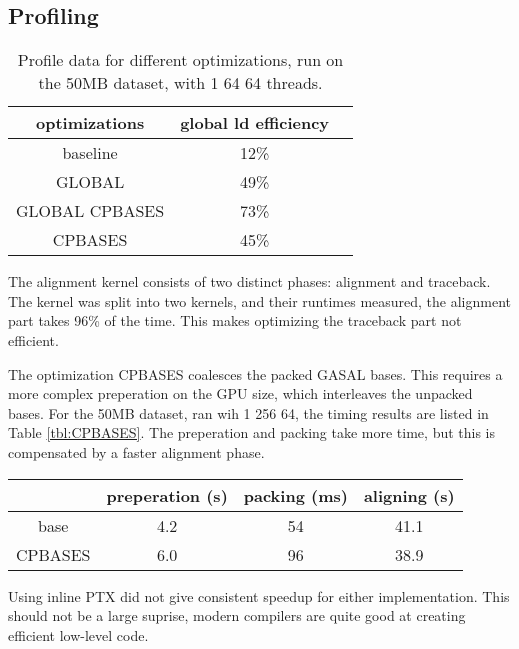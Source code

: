 \documentclass[../main/thesis.tex]{subfiles}
\begin{document}
\subsection{Profiling}

\begin{table}
\centering
\caption{Profile data for different optimizations, run on the 50MB dataset, with 1 64 64 threads.}
\label{tbl:darwin2}
\begin{tabular}{c c c}
optimizations & global ld efficiency \\ \hline
baseline & 12\% \\
GLOBAL & 49\% \\
GLOBAL CPBASES & 73\% \\
CPBASES & 45\% \\
\end{tabular}
\end{table}


The alignment kernel consists of two distinct phases: alignment and traceback.
The kernel was split into two kernels, and their runtimes measured, the alignment part takes 96\% of the time.
This makes optimizing the traceback part not efficient.


The optimization CPBASES coalesces the packed GASAL bases.
This requires a more complex preperation on the GPU size, which interleaves the unpacked bases.
For the 50MB dataset, ran wih 1 256 64, the timing results are listed in Table \ref{tbl:CPBASES}.
The preperation and packing take more time, but this is compensated by a faster alignment phase.

\begin{table}
\centering
\begin{tabular}{c c c c}
& preperation (s) & packing (ms) & aligning (s) \\ \hline
base & 4.2 & 54 & 41.1 \\
CPBASES & 6.0 & 96 & 38.9 \\
\end{tabular}
\end{table}


Using inline PTX did not give consistent speedup for either implementation.
This should not be a large suprise, modern compilers are quite good at creating efficient low-level code.
\end{document}
